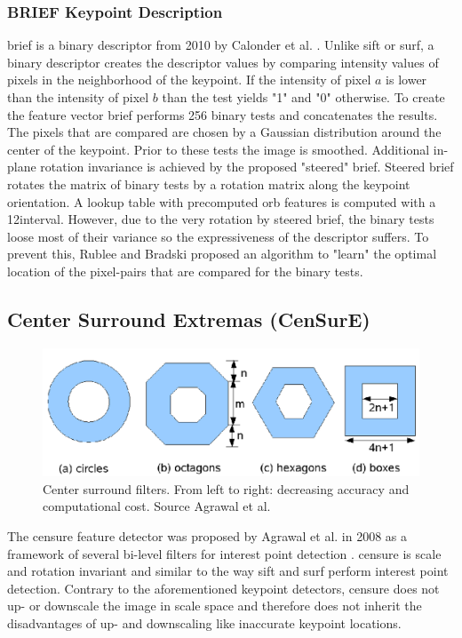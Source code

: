 \subsubsection*{BRIEF Keypoint Description}
\gls{brief} is a binary descriptor from 2010 by Calonder et al. \cite{Calonder2010}. Unlike \gls{sift} or \gls{surf}, a binary descriptor creates the descriptor values by comparing intensity values of pixels in the neighborhood of the keypoint. If the intensity of pixel $a$ is lower than the intensity of pixel $b$ than the test yields "1" and "0" otherwise. To create the feature vector \gls{brief}  performs 256 binary tests and concatenates the results. The pixels that are compared are chosen by a Gaussian distribution around the center of the keypoint. Prior to these tests the image is smoothed. Additional in-plane rotation invariance is achieved by the proposed "steered" \gls{brief}. Steered \gls{brief} rotates the matrix of binary tests by a rotation matrix along the keypoint orientation. A lookup table with precomputed \gls{orb} features is computed with a 12\degree  interval. However, due to the very rotation by steered \gls{brief}, the binary tests loose most of their variance so the expressiveness of the descriptor suffers. To prevent this, Rublee and Bradski proposed an algorithm to "learn" the optimal location of the pixel-pairs that are compared for the binary tests.

\subsection[CenSurE]{Center Surround Extremas (CenSurE)}
\begin{figure}
	\centering
	\includegraphics[scale=0.2]{figures/theoryCenSurE_filters}
	\caption{Center surround filters. From left to right: decreasing accuracy and computational cost.  Source Agrawal et al. \cite{Agrawal2008}}
	\label{fig:censureFilters}
\end{figure}
The \gls{censure} feature detector was proposed by Agrawal et al. in 2008 as a framework of several bi-level filters for interest point detection \cite{Agrawal2008}. \gls{censure} is scale and rotation invariant and similar to the way \gls{sift} and \gls{surf} perform interest point detection. Contrary to the aforementioned keypoint detectors, \gls{censure} does not up- or downscale the image in scale space and therefore does not inherit the disadvantages of up- and downscaling like inaccurate keypoint locations.

